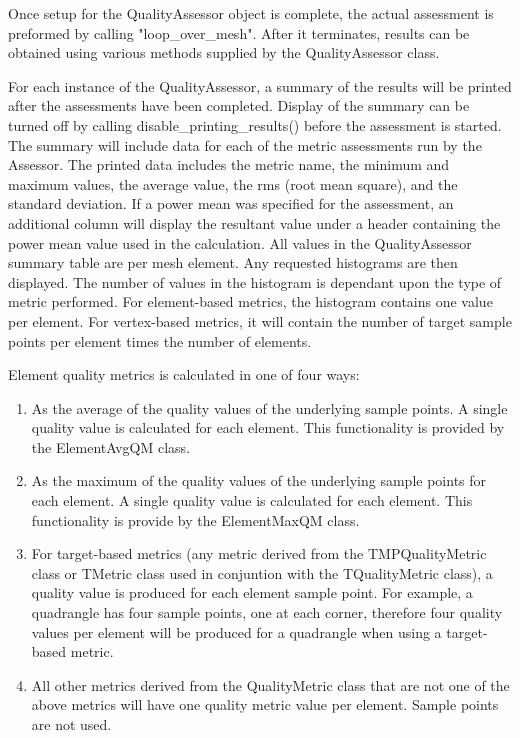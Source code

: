   Once setup for the QualityAssessor object is complete, the actual assessment is preformed by calling "loop\_over\_mesh".  After it terminates, results can be obtained using various methods supplied by the QualityAssessor class.

For each instance of the QualityAssessor, a summary of the results will be printed after the assessments have been completed. Display of the summary can be turned off by calling disable\_printing\_results() before the assessment is started.  The summary will include data for each of the metric assessments run by the Assessor.	 The printed data includes the metric name, the minimum and maximum values, the average value, the rms (root mean square), and the standard deviation.	If a power mean was specified for the assessment, an additional column will display the resultant value under a header containing the power mean value used in the calculation.	  All values in the QualityAssessor summary table are per mesh element.	 Any requested histograms are then displayed.  The number of values in the histogram is dependant upon the type of metric performed.  For element-based metrics, the histogram contains one value per element.	For vertex-based metrics, it will contain the number of target sample points per element times the number of elements.

Element quality metrics is calculated in one of  four ways:


\begin{enumerate}
\item As the average of the quality values of the underlying sample points.  A single quality value is calculated for each element.  This functionality is provided by the ElementAvgQM class.
\item As the maximum of the quality values of the underlying sample points for each element.  A single quality value is calculated for each element.  This functionality is provide by the ElementMaxQM class.
\item For target-based metrics (any metric derived from the TMPQualityMetric class or TMetric class used in conjuntion with the TQualityMetric class),  a quality value is produced for each element sample point.  For example, a quadrangle has four sample points, one at each corner, therefore four quality values per element will be produced for a quadrangle when using a target-based metric.
\item All other metrics derived from the QualityMetric class that are not one of the above metrics will have one quality metric value per element.  Sample points are not used.
\end{enumerate}


